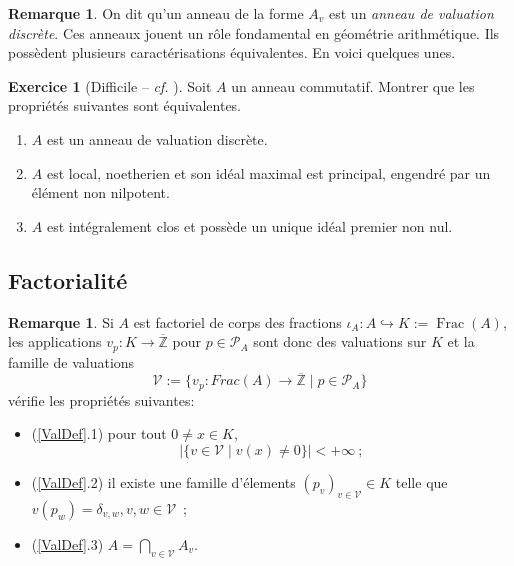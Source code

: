 \documentclass[a4paper, oneside, 12pt]{book}
\theoremstyle{theoremeStyle} %
\theoremstyle{definition} %
\newtheorem{remarque}[theoreme]{Remarque}
\newtheorem{exercice}[theoreme]{Exercice}
\DeclareMathOperator{\Frac}{Frac}
\newcommand{\Z}{\mathbb{Z}}
\begin{document}
\begin{remarque}
On dit qu'un anneau de la forme $A_v$ est un \textit{anneau de valuation discrète}. Ces anneaux jouent un rôle fondamental en géométrie arithmétique. Ils possèdent plusieurs caractérisations équivalentes. En voici quelques unes.
\end{remarque}

\begin{exercice}[{Difficile -- \textit{cf.} \cite[I,\S~2]{CL}}] %
  Soit $A$ un anneau commutatif. Montrer que les propriétés suivantes sont équivalentes.
  \begin{enumerate}
  \item $A$ est un anneau de valuation discrète.
  \item $A$ est local, noetherien et son idéal maximal est principal, engendré par un élément non nilpotent.
  \item $A$ est intégralement clos et possède un unique idéal premier non nul.\\
  \end{enumerate}
\end{exercice}



\subsection{Factorialité}
\begin{remarque}
  Si $A$ est factoriel de corps des fractions $\iota_A:A\hookrightarrow K:=\Frac(A)$, les applications $v_p:K\rightarrow \overline{\Z}$ pour $p\in\mathcal{P}_A$ sont donc des valuations sur $K$ et la famille de valuations
  $$\mathcal{V}:=\{v_p:Frac(A)\rightarrow \overline{\Z}\; |\; p\in\mathcal{P}_A\}$$
  vérifie les propriétés suivantes:
  \begin{itemize}
  \item (\ref{ValDef}.1) pour tout $0\not=x\in K$, $$|\{v\in\mathcal{V} \;|\; v (x)\not=0\}|<+\infty~;$$
  \item (\ref{ValDef}.2) il existe une famille d'élements $(p_v)_{v\in\mathcal{V}}\in K$ telle que $v(p_w)=\delta_{v,w}, v,w\in\mathcal{V}$~;
  \item (\ref{ValDef}.3) $A=\displaystyle{\bigcap_{v\in\mathcal{V}}}A_v$.
  \end{itemize}
\end{remarque}
\end{document}

